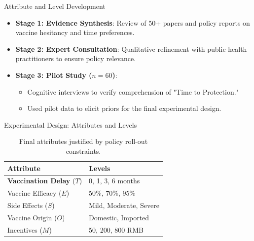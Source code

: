 \documentclass[10pt]{beamer}
\begin{document}
\begin{frame}{Attribute and Level Development}
\begin{itemize}
\item \textbf{Stage 1: Evidence Synthesis}: Review of 50+ papers and policy reports on vaccine hesitancy and time preferences.
\item \textbf{Stage 2: Expert Consultation}: Qualitative refinement with public health practitioners to ensure policy relevance.
\item \textbf{Stage 3: Pilot Study ($n=60$)}:
\begin{itemize}
\item Cognitive interviews to verify comprehension of "Time to Protection."
\item Used pilot data to elicit \alert{priors} for the final experimental design.
\end{itemize}
\end{itemize}
\end{frame}

\begin{frame}{Experimental Design: Attributes and Levels}
\begin{table}
\centering
\small
\begin{tabular}{ll}
\toprule
Attribute & Levels \\
\midrule
\textbf{Vaccination Delay} ($T$) & \alert{0, 1, 3, 6 months} \\
Vaccine Efficacy ($E$) & 50\%, 70\%, 95\% \\
Side Effects ($S$) & Mild, Moderate, Severe \\
Vaccine Origin ($O$) & Domestic, Imported \\
Incentives ($M$) & 50, 200, 800 RMB \\
\bottomrule
\end{tabular}
\caption{Final attributes justified by policy roll-out constraints.}
\end{table}
\end{frame}
\end{document}
